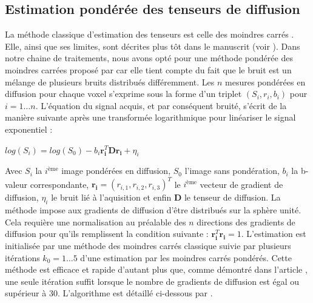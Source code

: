 \subsection{Estimation pondérée des tenseurs de diffusion}
La méthode classique d'estimation des tenseurs est celle des \og moindres carrés \fg.
Elle, ainsi que ses limites, sont décrites plus tôt dans le manuscrit (voir ).
Dans notre chaine de traitements, nous avons opté pour une méthode pondérée des moindres carrées proposé par \cite{Zhu2007} car
elle tient compte du fait que le bruit est un mélange de plusieurs bruits distribués différemment.
Les $n$ mesures pondérées en diffusion pour chaque voxel s'exprime sous la forme d'un triplet $(S_i, r_i, b_i)$ pour $i=1\ldots n$.
L'équation du signal acquis, et par conséquent bruité, s'écrit de la manière suivante après une transformée logarithmique pour linéariser le signal exponentiel : 
\begin{center}
    $log(S_i) = log(S_0) - b_i\textbf{r}_\textbf{i}^T\textbf{D}\textbf{r}_\textbf{i} + \eta_i$
\end{center}
Avec $S_i$ la $i^\text{ème}$ image pondérées en diffusion, $S_0$ l'image sans pondération, $b_i$ la b-valeur correspondante,
$\textbf{r}_\textbf{i} = (r_{i,1}, r_{i,2}, r_{i,3})^T$ le $i^\text{ème}$ vecteur de gradient de diffusion, $\eta_i$ le bruit lié à l'aquisition 
et enfin $\textbf{D}$ le tenseur de diffusion.
La méthode impose aux gradients de diffusion d'être distribués sur la sphère unité. 
Cela requière une normalisation au préalable des $n$ directions des gradients de diffusion pour qu'ils remplissent la condition suivante :
$\textbf{r}_\textbf{i}^{T}\textbf{r}_\textbf{i} = 1$.
L'estimation est initialisée par une méthode des moindres carrés classique suivie par plusieurs itérations $k_0 = 1\ldots 5$ d'une estimation par les moindres carrés pondérés.
Cette méthode est efficace et rapide d'autant plus que, comme démontré dans l'article \cite{Zhu2007}, 
une seule itération suffit lorsque le nombre de gradients de diffusion est égal ou supérieur à 30.
L'algorithme est détaillé ci-dessous par .

